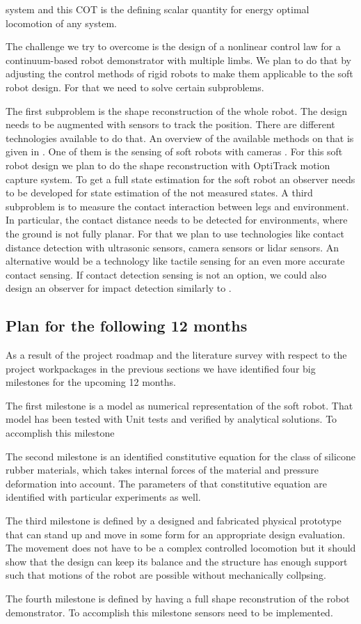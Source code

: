     system and this COT is the defining scalar quantity for energy optimal locomotion of any system.
\par  
  The challenge we try to overcome is the design of a nonlinear control law for a continuum-based robot demonstrator with multiple limbs. We plan to do that by adjusting the control
   methods of rigid robots to make them applicable to the soft robot design. For that we need to solve certain subproblems.
\par
   The first subproblem is the shape reconstruction of the whole robot. The design needs to be augmented with sensors to track the position. There are different technologies available
   to do that. An overview of the available methods on that is given in \cite{Wang2018}. One of them is the sensing of soft robots with cameras \cite{Rosi2022_conf}. For this soft 
   robot design we plan to do the shape reconstruction with OptiTrack motion capture system.  
  To get a full state estimation for the soft robot an observer needs to be developed for state estimation of the not measured states.
  A third subproblem is to measure the contact interaction between legs and environment. In particular, the contact distance needs to be detected for environments,
   where the ground is not fully planar. For that we plan to use technologies like contact distance detection with ultrasonic sensors, camera sensors or lidar
   sensors. An alternative would be a technology like tactile sensing for an even more accurate contact sensing. If contact detection sensing is not an option, we could also design
  an observer for impact detection similarly to \cite{Preiswerk2022}.  

\subsection*{Plan for the following 12 months}
As a result of the project roadmap and the literature survey with respect to the project workpackages in the previous sections we have identified four big milestones for the upcoming
12 months. \par
%
The first milestone is a model as numerical representation of the soft robot. That model has been tested with Unit tests and verified by analytical solutions.
%
To accomplish this milestone
\par
The second milestone is an identified constitutive equation for the class of silicone rubber materials, which takes internal forces of the material and pressure deformation into account.
The parameters of that constitutive equation are identified with particular experiments as well. 
%
\par
%
The third milestone is defined by a designed and fabricated physical prototype that can stand up and move in some form for an appropriate design evaluation.
The movement does not have to be a complex controlled locomotion but it should show that the design can keep its balance
 and the structure has enough support such that motions of the robot are possible without mechanically collpsing.
%
\par
The fourth milestone is defined by having a full shape reconstrution of the robot demonstrator.
%
To accomplish this milestone sensors need to be implemented.
%
